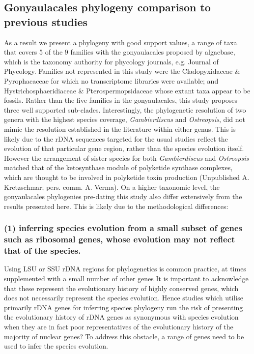 \documentclass[12pt]{article}
\begin{document}
\subsection*{Gonyaulacales phylogeny comparison to previous studies} 
As a result we present a phylogeny with good support values, a range of taxa that covers 5 of the 9 families with the gonyaulacales proposed by algaebase, which is the taxonomy authority for phycology journals, e.g. Journal of Phycology. 
Families not represented in this study were the Cladopyxidaceae \& Pyrophacaceae for which no transcriptome libraries were available; and Hystrichosphaeridiaceae \& Pterospermopsidaceae whose extant taxa appear to be fossils.
Rather than the five families in the gonyaulacales, this study proposes three well supported sub-clades. 
Interestingly, the phylogenetic resolution of two genera with the highest species coverage, \emph{Gambierdiscus} and \emph{Ostreopsis}, did not mimic the resolution established in the literature within either genus. 
This is likely due to the rDNA sequences targeted for the usual studies reflect the evolution of that particular gene region, rather than the species evolution itself. 
However the arrangement of sister species for both \emph{Gambierdiscus} and \emph{Ostreopsis} matched that of the ketosynthase module of polyketide synthase complexes, which are thought to be involved in polyketide toxin production (Unpublished A. Kretzschmar; pers. comm. A. Verma). 
On a higher taxonomic level, the gonyaulacales phylogenies pre-dating this study also differ extensively from the results presented here. 
This is likely due to the methodological differences: 
\subsubsection*{(1) inferring species evolution from a small subset of genes such as ribosomal genes, whose evolution may not reflect that of the species.}
Using LSU or SSU rDNA regions for phylogenetics is common practice, at times supplemented with a small number of other genes \cite{shalchian2006combined,zhang2007three,saldarriaga2004molecular,murray2005improving,hoppenrath2010dinoflagellate} 
It is important to acknowledge that these represent the evolutionary history of highly conserved genes, which does not necessarily represent the species evolution. 
Hence studies which utilise primarily rDNA genes for inferring species phylogeny run the risk of presenting the evolutionary history of rDNA genes as synonymous with species evolution when they are in fact poor representatives of the evolutionary history of the majority of nuclear genes?
To address this obstacle, a range of genes need to be used to infer the species evolution.
\end{document}
